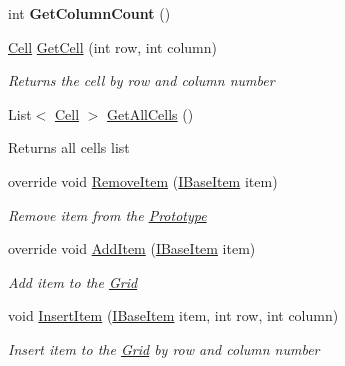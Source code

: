 \begin{DoxyCompactItemize}
int {\bfseries Get\+Column\+Count} ()
\item 
\mbox{\hyperlink{class_space_v_i_l_1_1_cell}{Cell}} \mbox{\hyperlink{class_space_v_i_l_1_1_grid_ad6866d757055ed488fac7ccceb62031c}{Get\+Cell}} (int row, int column)
\begin{DoxyCompactList}\small\item\em Returns the cell by row and column number \end{DoxyCompactList}\item 
\mbox{\label{class_space_v_i_l_1_1_grid_ada36a5ab920b909fdb5d776deb5525b1}} 
List$<$ \mbox{\hyperlink{class_space_v_i_l_1_1_cell}{Cell}} $>$ \mbox{\hyperlink{class_space_v_i_l_1_1_grid_ada36a5ab920b909fdb5d776deb5525b1}{Get\+All\+Cells}} ()
\begin{DoxyCompactList}\small\item\em \begin{DoxyReturn}{Returns}
all cells list 
\end{DoxyReturn}
\end{DoxyCompactList}\item 
override void \mbox{\hyperlink{class_space_v_i_l_1_1_grid_a75bf61cabb387baea7461141dce079fb}{Remove\+Item}} (\mbox{\hyperlink{interface_space_v_i_l_1_1_core_1_1_i_base_item}{I\+Base\+Item}} item)
\begin{DoxyCompactList}\small\item\em Remove item from the \mbox{\hyperlink{class_space_v_i_l_1_1_prototype}{Prototype}} \end{DoxyCompactList}\item 
override void \mbox{\hyperlink{class_space_v_i_l_1_1_grid_a5b339dbf56352afd9546f66ef4c02416}{Add\+Item}} (\mbox{\hyperlink{interface_space_v_i_l_1_1_core_1_1_i_base_item}{I\+Base\+Item}} item)
\begin{DoxyCompactList}\small\item\em Add item to the \mbox{\hyperlink{class_space_v_i_l_1_1_grid}{Grid}} \end{DoxyCompactList}\item 
void \mbox{\hyperlink{class_space_v_i_l_1_1_grid_a2292fca3813854b6077716e00ad54df4}{Insert\+Item}} (\mbox{\hyperlink{interface_space_v_i_l_1_1_core_1_1_i_base_item}{I\+Base\+Item}} item, int row, int column)
\begin{DoxyCompactList}\small\item\em Insert item to the \mbox{\hyperlink{class_space_v_i_l_1_1_grid}{Grid}} by row and column number \end{DoxyCompactList}\item 

\end{DoxyCompactItemize}
